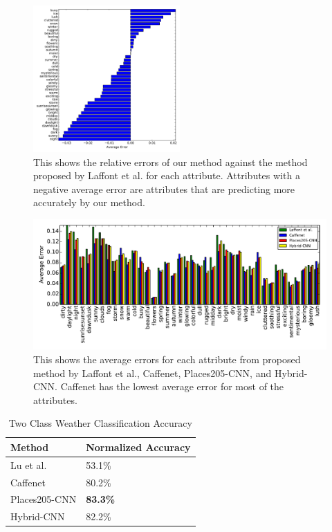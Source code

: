 \documentclass{article}
\begin{document}
\begin{figure}[t]
	\centering
		\includegraphics[width=0.5\textwidth]{figs/rel_err.pdf}
		\caption{This shows the relative errors of our method against the method 
						 proposed by Laffont et al. for each attribute.  Attributes with a 
						 negative average error are attributes that are predicting more 
						 accurately by our method.}
		\label{fig:relerr}
\end{figure}

\begin{figure}[t]
	\centering
		\includegraphics[width=1.0\textwidth]{figs/avg_err_compare.pdf}
		\caption{This shows the average errors for each attribute from proposed method
						 by Laffont et al., Caffenet, Places205-CNN, and Hybrid-CNN.  Caffenet
						 has the lowest average error for most of the attributes.}
		\label{fig:compare}
\end{figure}

\begin{table}[t]
	\centering
	\begin{tabular}{ | l | l | }
		\hline
			Method & Normalized Accuracy \\ \hline
			Lu et al. & 53.1\% \\ \hline
			Caffenet & 80.2\% \\ \hline
			Places205-CNN & \textbf{83.3\%} \\ \hline
			Hybrid-CNN & 82.2\% \\ 
		\hline
	\end{tabular}
	\caption{Two Class Weather Classification Accuracy}
	\label{tbl:twoclass}
\end{table}
\end{document}
